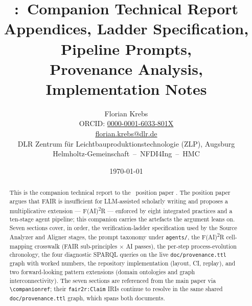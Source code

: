\documentclass[11pt,a4paper]{article}
\title{\faiar:\ Companion Technical Report\\
       \large Appendices, Ladder Specification, Pipeline Prompts,\\
       Provenance Analysis, Implementation Notes}
\author{%
  Florian Krebs\\[2pt]
  \small ORCID: \href{https://orcid.org/0000-0001-6033-801X}{0000-0001-6033-801X}\\
  \small \href{mailto:florian.krebs@dlr.de}{florian.krebs@dlr.de}\\[4pt]
  \small DLR Zentrum für Leichtbauproduktionstechnologie (ZLP), Augsburg\\
  \small Helmholtz-Gemeinschaft \,--\, NFDI4Ing \,--\, HMC%
}
\date{\today}
\begin{document}
\maketitle

\begin{abstract}
This is the companion technical report to the \faiar\ position paper
. The position paper argues that FAIR is insufficient
for LLM-assisted scholarly writing and proposes a multiplicative
extension --- F(AI)\textsuperscript{2}R --- enforced by eight
integrated practices and a ten-stage agent pipeline; this companion
carries the artefacts the argument leans on. Seven sections cover, in
order, the verification-ladder specification used by the Source
Analyzer and Aligner stages, the prompt taxonomy under
\texttt{agents/}, the F(AI)\textsuperscript{2}R cell-mapping
crosswalk (FAIR sub-principles \(\times\) AI passes), the per-step
process-evolution chronology, the four diagnostic SPARQL queries on
the live \texttt{doc/provenance.ttl} graph with worked numbers, the
repository implementation (layout, CI, replay), and two forward-looking
pattern extensions (domain ontologies and graph interconnectivity).
The seven sections are referenced from the main paper via
\texttt{\textbackslash companionref}; their \texttt{fair2r:Claim}
IRIs continue to resolve in the same shared
\texttt{doc/provenance.ttl} graph, which spans both documents.
\end{abstract}

\tableofcontents









\printbibliography
\end{document}
